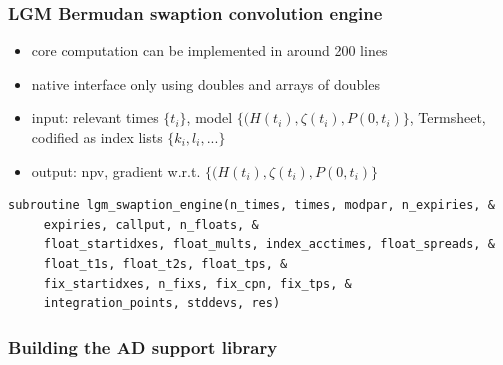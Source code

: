 \documentclass{beamer}
\begin{document}
\begin{frame}[fragile]
\frametitle{LGM Bermudan swaption convolution engine}
\begin{itemize}
\item core computation can be implemented in around 200 lines
\item native interface only using doubles and arrays of doubles
\item input: relevant times $\{t_i\}$, model $\{(H(t_i), \zeta(t_i), P(0,t_i)\}$,
Termsheet, codified as index lists $\{k_i, l_i, ...\}$
\item output: npv, gradient w.r.t. $\{(H(t_i), \zeta(t_i), P(0,t_i)\}$
\end{itemize}
\begin{verbatim}
subroutine lgm_swaption_engine(n_times, times, modpar, n_expiries, &
     expiries, callput, n_floats, &
     float_startidxes, float_mults, index_acctimes, float_spreads, &
     float_t1s, float_t2s, float_tps, &
     fix_startidxes, n_fixs, fix_cpn, fix_tps, &
     integration_points, stddevs, res)
\end{verbatim}
\end{frame}

\begin{frame}[fragile]
\frametitle{Building the AD support library}
\end{frame}
\end{document}
